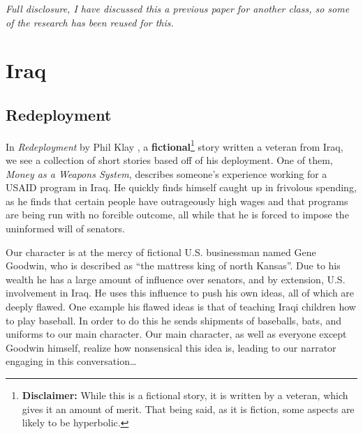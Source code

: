 \documentclass[12pt, twoside]{article}
\begin{document}
    \textit{Full disclosure, I have discussed this a previous paper for another class, so some of the research has been reused for this.}

\section{Iraq}

    \subsection{Redeployment}
        In \textit{Redeployment} by Phil Klay \parencite{Klay2014}, a \textbf{fictional}\footnote{\textbf{Disclaimer:} While this is a fictional story, it is written by a veteran, which gives it an amount of merit. That being said, as it is fiction, some aspects are likely to be hyperbolic.} 
        story written a veteran from Iraq, we see a collection of short stories based off of his deployment. One of them, \textit{Money as a Weapons System}, describes someone's experience working for a USAID program in Iraq. He quickly finds himself caught up in frivolous spending, as he finds that certain people have outrageously high wages and that programs are being run with no forcible outcome, all while that he is forced to impose the uninformed will of senators.

        Our character is at the mercy of fictional U.S. businessman named Gene Goodwin, who is described as ``the mattress king of north Kansas''. Due to his wealth he has a large amount of influence over senators, and by extension, U.S. involvement in Iraq. He uses this influence to push his own ideas, all of which are deeply flawed. One example his flawed ideas is that of teaching Iraqi children how to play baseball. In order to do this he sends shipments of baseballs, bats, and uniforms to our main character. Our main character, as well as everyone except Goodwin himself, realize how nonsensical this idea is, leading to our narrator engaging in this conversation\ldots
        
\end{document}
